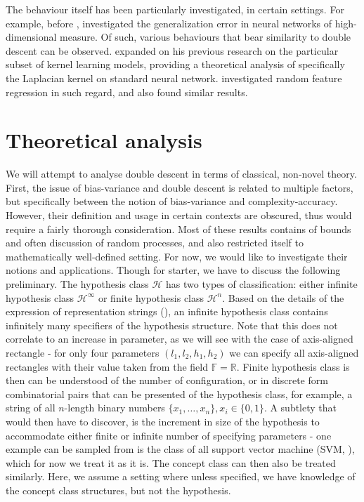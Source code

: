 \documentclass[10pt,oneside,oldfontcommands,dvipsnames,article]{memoir}
\begin{document}
The behaviour itself has been particularly investigated, in certain settings. For example, before \cite{belkin_reconciling_2019}, \cite{advani2017highdimensionaldynamicsgeneralizationerror} investigated the generalization error in neural networks of high-dimensional measure. Of such, various behaviours that bear similarity to double descent can be observed. \cite{belkin2018understanddeeplearningneed} expanded on his previous research on the particular subset of kernel learning models, providing a theoretical analysis of specifically the Laplacian kernel on standard neural network. \cite{mei2020generalizationerrorrandomfeatures} investigated random feature regression in such regard, and also found similar results. 

\clearpage

\section{Theoretical analysis}

We will attempt to analyse double descent in terms of classical, non-novel theory. First, the issue of bias-variance and double descent is related to multiple factors, but specifically between the notion of bias-variance and complexity-accuracy. However, their definition and usage in certain contexts are obscured, thus would require a fairly thorough consideration. Most of these results contains of bounds and often discussion of random processes, and also restricted itself to mathematically well-defined setting. For now, we would like to investigate their notions and applications. Though for starter, we have to discuss the following preliminary. The hypothesis class $\mathcal{H}$ has two types of classification: either infinite hypothesis class $\mathcal{H}^{\infty}$ or finite hypothesis class $\mathcal{H}^{n}$. Based on the details of the expression of representation strings (\cite{10.5555/200548}), an infinite hypothesis class contains infinitely many specifiers of the hypothesis structure. Note that this does not correlate to an increase in parameter, as we will see with the case of axis-aligned rectangle - for only four parameters $(l_{1},l_{2},h_{1},h_2)$ we can specify all axis-aligned rectangles with their value taken from the field $\mathbb{F}=\mathbb{R}$. Finite hypothesis class is then can be understood of the number of configuration, or in discrete form combinatorial pairs that can be presented of the hypothesis class, for example, a string of all $n$-length binary numbers $\{x_{1},\dots,x_{n}\}, x_{i}\in \{0,1\}$. A subtlety that would then have to discover, is the increment in size of the hypothesis to accommodate either finite or infinite number of specifying parameters - one example can be sampled from is the class of all support vector machine (SVM, \cite{Vapnik1999-VAPTNO}), which for now we treat it as it is. The concept class can then also be treated similarly. Here, we assume a setting where unless specified, we have knowledge of the concept class structures, but not the hypothesis. 
\end{document}
